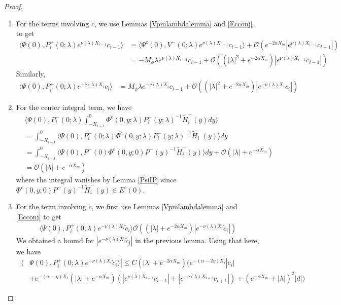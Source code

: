 \documentclass[thesis.tex]{subfiles}
\begin{document}
\begin{lemma}
\begin{proof}
\begin{enumerate}
\item For the terms involving $c$, we use Lemmas \ref{Vpmlambdalemma} and \ref{Ecconj} to get
\begin{align*}
\langle \Psi(0), P_i^-(0; \lambda) e^{\nu(\lambda) X_{i-1}} c_{i-1} \rangle &= \langle \Psi^c(0), V^-(0; \lambda) e^{\nu(\lambda) X_{i-1}} c_{i-1} \rangle + \mathcal{O}(e^{-2 \alpha X_m}|e^{\nu(\lambda) X_{i-1}} c_{i-1}|) \\
&= -M_\phi \lambda e^{\nu(\lambda) X_{i-1}} c_{i-1} + \mathcal{O}((|\lambda|^2 + e^{-2 \alpha X_m})|e^{\nu(\lambda) X_{i-1}} c_{i-1}|)
\end{align*}
Similarly,
\begin{align*}
\langle \Psi(0), P_i^+(0; \lambda) e^{-\nu(\lambda) X_i} c_i \rangle 
&= M_\phi \lambda e^{-\nu(\lambda) X_i} c_{i-1} + \mathcal{O}((|\lambda|^2 + e^{-2 \alpha X_m})|e^{-\nu(\lambda) X_i} c_i|)
\end{align*}

\item For the center integral term, we have
\begin{align*}
&\langle \Psi(0), P_i^-(0; \lambda)
\int_{-X_{i-1}}^0 \Phi^c(0, y; \lambda) P_i^-(y; \lambda)^{-1} \tilde{H}_i^-(y) dy \rangle \\
&= \int_{-X_{i-1}}^0 \langle \Psi(0), P_i^-(0; \lambda) \Phi^c(0, y; \lambda) P_i^-(y; \lambda)^{-1} \tilde{H}_i^-(y) \rangle dy \\
&= \int_{-X_{i-1}}^0 \langle \Psi(0), P^-(0) \Phi^c(0, y; 0) P^-(y)^{-1} \tilde{H}_i^-(y) \rangle dy + \mathcal{O}(|\lambda| + e^{-\alpha X_m}) \\
&= \mathcal{O}(|\lambda| + e^{-\alpha X_m})
\end{align*}
where the integral vanishes by Lemma \ref{PsiIP} since $\Phi^c(0, y; 0) P^-(y)^{-1} \tilde{H}_i^-(y) \in E^c(0)$.

\item For the term involving $\tilde{c}$, we first use Lemmas \ref{Vpmlambdalemma} and \ref{Ecconj} to get
\begin{align*}
\langle \Psi(0), P_i^+(0; \lambda) e^{-\nu(\lambda) X_i}\tilde{c}_i \rangle \mathcal{O}((|\lambda| + e^{-2 \alpha X_m})|e^{-\nu(\lambda) X_i}\tilde{c}_i|)
\end{align*}
We obtained a bound for $|e^{-\nu(\lambda) X_i}\tilde{c}_i|$ in the previous lemma. Using that here, we have
\begin{align*}
|\langle &\Psi(0), P_i^+(0; \lambda) e^{-\nu(\lambda) X_i}\tilde{c}_i \rangle| \leq C (|\lambda| + e^{-2 \alpha X_m})\Big( e^{-(\alpha - 2\eta)X_i}|c_i| \\
&+ e^{-(\alpha-\eta) X_i} (|\lambda| + e^{-\alpha X_m})(|e^{\nu(\lambda)X_{i-1}} c_{i-1}| + |e^{-\nu(\lambda)X_{i+1}}c_{i+1}|) + (e^{-\alpha X_m} + |\lambda|)^2|d|  \Big)
\end{align*}


\end{enumerate}
\end{proof}
\end{lemma}
\end{document}
